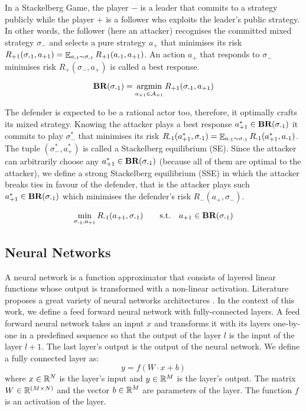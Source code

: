 In a Stackelberg Game, the player $\minus$ is a leader that commits to a strategy publicly while the player $\plus$ is a follower who exploits the leader's public strategy.
In other words, the follower (here an attacker) recognises the committed mixed strategy $\sigma_\minus$ and selects a pure strategy $a_\plus$ that minimises its risk $R_{{\text{+}1}}(\sigma_{{\text{-}1}}, a_{{\text{+}1}}) = \mathop{\mathbb{E}}_{a_{{\text{-}1}} \sim \sigma_{{\text{-}1}}} R_{{\text{+}1}}(a_{{\text{-}1}}, a_{{\text{+}1}})$.
An action $a_\plus$ that responds to $\sigma_\minus$ minimises risk $R_\plus(\sigma_\minus, a_\plus)$ is called a best response.

\begin{equation}
    \textbf{BR}(\sigma_{{\text{-}1}}) = \mathop{\text{argmin}}_{a_{{\text{+}1}} \in \mathcal{A}_{{\text{+}1}}} R_{{\text{+}1}}(\sigma_{{\text{-}1}}, a_{{\text{+}1}})
\end{equation}

The defender is expected to be a rational actor too, therefore, it optimally crafts its mixed strategy. Knowing the attacker plays a best response $a^*_{{\text{+}1}} \in \textbf{BR}(\sigma_{{\text{-}1}})$ it commits to play $\sigma^*_\minus$ that minimises its risk $R_{{\text{-}1}}(a^*_{{\text{+}1}}, \sigma_{{\text{-}1}}) = \mathop{\mathbb{E}}_{a_{{\text{-}1}} \sim \sigma_{{\text{-}1}}} R_{{\text{-}1}}(a^*_{{\text{+}1}}, a_{{\text{-}1}})$. The tuple $(\sigma^*_\minus, a^*_\plus)$ is called a Stackelberg equilibrium (SE).
Since the attacker can arbitrarily choose any $a^*_{{\text{+}1}} \in \textbf{BR}(\sigma_{{\text{-}1}})$ (because all of them are optimal to the attacker), we define a strong Stackelberg equilibrium (SSE) in which the attacker breaks ties in favour of the defender, that is the attacker plays such $a^*_{{\text{+}1}} \in \textbf{BR}(\sigma_{{\text{-}1}})$ which minimises the defender's risk $R_\minus(a_\plus, \sigma_\minus)$.

\begin{equation}
    \min_{\sigma_{{\text{-}1}}, a_{{\text{+}1}}} R_{{\text{-}1}}(a_{{\text{+}1}}, \sigma_{{\text{-}1}}) \qquad \text{s.t.} \quad  a_{{\text{+}1}} \in \textbf{BR}(\sigma_{{\text{-}1}})
\end{equation}

\subsection{Neural Networks}
A neural network is a function approximator that consists of layered linear functions whose output is transformed with a non-linear activation. Literature proposes a great variety of neural networks architectures \cite{relu, selu, defense_gan, gan, pgd, image_net, cnn, transformer}. In the context of this work, we define a feed forward neural network with fully-connected layers. A feed forward neural network takes an input $x$ and transforms it with its layers one-by-one in a predefined sequence so that the output of the layer $l$ is the input of the layer $l+1$. The last layer's output is the output of the neural network. We define a fully connected layer as:
\begin{equation}
    y = f(W \cdot x + b)
\end{equation}
where $x \in \mathbb{R}^N$ is the layer's input and $y \in \mathbb{R}^M$ is the layer's output. The matrix $W \in \mathbb{R}^{(M \times N)}$ and the vector $b \in \mathbb{R}^M$ are parameters of the layer. The function $f$ is an activation of the layer.

